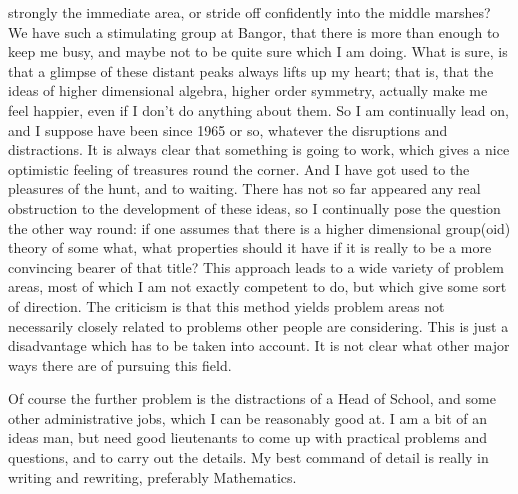 strongly the immediate area, or stride off confidently into the middle
marshes? We have such a stimulating group at Bangor, that there is more
than enough to keep me busy, and maybe not to be quite sure which I am
doing. What is sure, is that a glimpse of these distant peaks always lifts
up my heart; that is, that the ideas of higher dimensional algebra, higher
order symmetry, actually make me feel happier, even if I don't do anything
about them. So I am continually lead on, and I suppose have been since 1965
or so, whatever the disruptions and distractions. It is always clear that
something is going to work, which gives a nice optimistic feeling of
treasures round the corner. And I have got used to the pleasures of the
hunt, and to waiting. There has not so far appeared any real obstruction to
the development of these ideas, so I continually pose the question the other
way round: if one assumes that there is a higher dimensional group(oid)
theory of some what, what properties should it have if it is really to be a
more convincing bearer of that title? This approach leads to a wide variety
of problem areas, most of which I am not exactly competent to do, but which
give some sort of direction. The criticism is that this method yields
problem areas not necessarily closely related to problems other people are
considering. This is just a disadvantage which has to be taken into
account. It is not clear what other major ways there are of pursuing this
field.

Of course the further problem is the distractions of a Head of School,
and some other administrative jobs, which I can be reasonably good at. I am
a bit of an ideas man, but need good lieutenants to come up with practical
problems and questions, and to carry out the details. My best command of
detail is really in writing and rewriting, preferably Mathematics.

